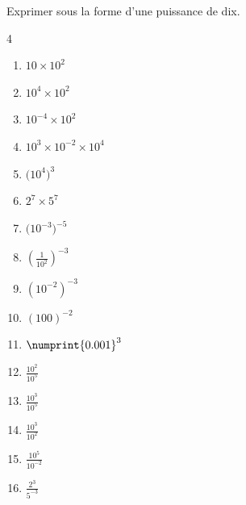 \documentclass[main.tex]{subfiles}
\begin{document}
\begin{exercise}	Exprimer sous la forme d'une puissance de dix.  
	\begin{multicols}{4} 
		\begin{enumerate}[label={$\Alph*=$}]  
			\item\rule[-0.6em]{0em}{2.4em} $10\times 10^2$
			\item\rule[-0.6em]{0em}{2.4em} $10^4\times 10^2$
			\item\rule[-0.6em]{0em}{2.4em} $10^{-4}\times 10^2$
			\item\rule[-0.6em]{0em}{2.4em} $10^3\times 10^{-2} \times 10^{4}$ 
			\item\rule[-0.6em]{0em}{2.4em} $\big(10^4\big)^3$  
			\item\rule[-0.6em]{0em}{2.4em} $2^7\times 5^7$  
			\item\rule[-0.6em]{0em}{2.4em} $\big(10^{-3}\big)^{-5}$  
			\item\rule[-0.6em]{0em}{2.4em}  $\left(\frac{1}{10^2}\right)^{-3}$  
			\item\rule[-0.6em]{0em}{2.4em} $\left(10^{-2}\right)^{-3}$ 
			\item\rule[-0.6em]{0em}{2.4em} $(100)^{-2}$
			\item\rule[-0.6em]{0em}{2.4em} $\numprint{0.001}^3  $
			\item\rule[-0.6em]{0em}{2.4em} $\frac{10^2}{10^5} $ 
			\item\rule[-0.6em]{0em}{2.4em} $\frac{10^3}{10^5}$
			\item\rule[-0.6em]{0em}{2.4em} $\frac{10^3}{10^2}$
			\item\rule[-0.6em]{0em}{2.4em} $\frac{10^5}{10^{-2}}$
			\item\rule[-0.6em]{0em}{2.4em} $\frac{2^3}{5^{-3}} $   
		\end{enumerate}
	\end{multicols}
\end{exercise} 
\end{document}
